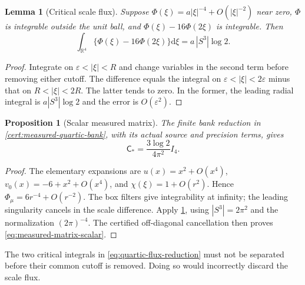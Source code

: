 \documentclass[11pt,oneside,openany]{book}
\newtheorem{proposition}[proposition]{Proposition}
\newtheorem{lemma}[lemma]{Lemma}
\theoremstyle{definition}
\theoremstyle{remark}
\newcommand{\R}{\mathbb R}
\newcommand{\dd}{\mathrm d}
\begin{document}
\begin{lemma}[Critical scale flux]
\label{lem:critical-scale-flux}
Suppose $\Phi(\xi)=a|\xi|^{-4}+O(|\xi|^{-2})$ near zero,
$\Phi$ is integrable outside the unit ball, and
$\Phi(\xi)-16\Phi(2\xi)$ is integrable. Then
\begin{equation}
 \int_{\R^4}\{\Phi(\xi)-16\Phi(2\xi)\}\dd\xi
                        =a\,|S^3|\log2.
 \label{eq:critical-scale-flux}
\end{equation}
\end{lemma}
\begin{proof}
Integrate on $\varepsilon<|\xi|<R$ and change variables in the second
term before removing either cutoff. The difference equals the integral
on $\varepsilon<|\xi|<2\varepsilon$ minus that on $R<|\xi|<2R$.
The latter tends to zero. In the former, the leading radial integral
is $a|S^3|\log2$ and the error is $O(\varepsilon^2)$.
\end{proof}

\begin{proposition}[Scalar measured matrix]
\label{prop:measured-matrix-scalar}
The finite bank reduction in \cref{cert:measured-quartic-bank}, with its
actual source and precision terms, gives
\begin{equation}
 \mathsf C_* =\frac{3\log2}{4\pi^2}I_4.
 \label{eq:measured-matrix-scalar}
\end{equation}
\end{proposition}
\begin{proof}
The elementary expansions are $u(x)=x^2+O(x^4)$,
$v_0(x)=-6+x^2+O(x^4)$, and $\chi(\xi)=1+O(r^2)$.
Hence $\Phi_\mu=6r^{-4}+O(r^{-2})$. The box filters give integrability
at infinity; the leading singularity cancels in the scale difference.
Apply \cref{lem:critical-scale-flux}, using $|S^3|=2\pi^2$ and the
normalization $(2\pi)^{-4}$. The certified off-diagonal cancellation
then proves \cref{eq:measured-matrix-scalar}.
\end{proof}
The two critical integrals in \cref{eq:quartic-flux-reduction} must not
be separated before their common cutoff is removed. Doing so would
incorrectly discard the scale flux.
\end{document}

